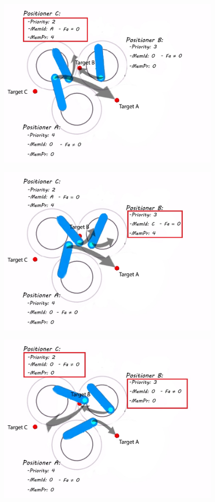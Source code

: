 \documentclass[]{spie}  %
\begin{document}
\begin{figure}[H]
\begin{minipage}[t]{5.2cm}
 			\includegraphics[scale=0.3]{images/ID_PR0.jpg}
 			\label{ID_PR0}
 		\end{minipage}
 		\begin{minipage}[t]{5.4cm}
 			\includegraphics[scale=0.3]{images/ID_PR1.jpg}
 			\label{ID_PR1}
 		\end{minipage}
 		\begin{minipage}[t]{5.4cm}
 			\includegraphics[scale=0.3]{images/ID_PR2.jpg}

\end{minipage}
\end{figure}
\end{document}
